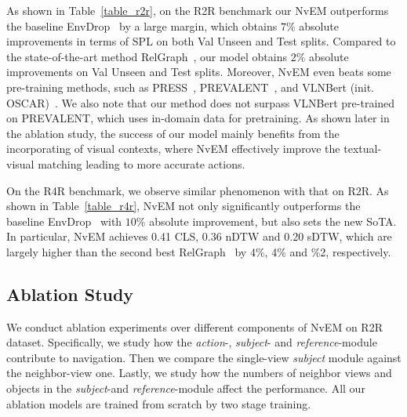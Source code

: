 \documentclass[sigconf]{acmart}
\begin{document}
As shown in Table~\ref{table_r2r}, on the R2R benchmark  our NvEM outperforms the baseline EnvDrop~\cite{tan2019envdrop} by a large margin, which obtains $7\%$ absolute improvements in terms of SPL on both Val Unseen and Test splits.
Compared to the state-of-the-art method RelGraph~\cite{hong2020relgraph}, our model obtains $2\%$ absolute improvements on Val Unseen and Test splits. 
Moreover, NvEM even beats some pre-training methods, such as PRESS~\cite{li2019press}, PREVALENT~\cite{hao2020prevelant}, and VLNBert (init. OSCAR)~\cite{hong2020vln-bert}. 
We also note that our method does not surpass VLNBert pre-trained on PREVALENT, which uses in-domain data for pretraining.
As shown later in the ablation study, the success of our model mainly benefits from  the  incorporating of visual contexts, where NvEM effectively improve the textual-visual matching leading to more accurate actions. 


On the R4R benchmark, we observe similar phenomenon with that on R2R. As shown in Table~\ref{table_r4r}, NvEM not only significantly outperforms the baseline EnvDrop~\cite{tan2019envdrop} with $10\%$ absolute improvement, but also sets the new SoTA. 
In particular, NvEM achieves 0.41 CLS, 0.36 nDTW and 0.20 sDTW, which are largely higher than the second best RelGraph~\cite{hong2020relgraph} by 4\%, 4\% and \%2, respectively. 


\subsection{Ablation Study}\label{sec_ablation}
We conduct  ablation experiments over different components of NvEM on R2R dataset. Specifically, we study how the \textit{action}-, \textit{subject}- and \textit{reference}-module contribute to navigation. Then we compare the single-view \textit{subject} module against the neighbor-view one. Lastly, we study how the numbers of neighbor views and objects in the \textit{subject}-and \textit{reference}-module affect the performance. All our ablation models are trained from scratch by two stage training.
\end{document}
